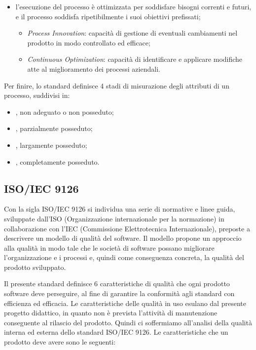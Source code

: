 \begin{itemize}
\begin{itemize}
        \end{itemize}
     \item  {} l'esecuzione del processo è ottimizzata per soddisfare bisogni correnti e futuri, e il processo soddisfa ripetibilmente i suoi obiettivi prefissati;
            \begin{itemize}
            	\item \emph{Process Innovation}: capacità di gestione di eventuali cambiamenti nel prodotto in modo controllato ed efficace;
            	\item \emph{Continuous Optimization}: capacità di identificare e applicare modifiche atte al miglioramento dei processi aziendali.
            \end{itemize} 
\end{itemize}
Per finire, lo standard definisce 4 stadi di misurazione degli attributi di un processo, suddivisi in:
\begin{itemize}
	\item {}, non adeguato o non posseduto;
	\item {}, parzialmente posseduto;
	\item {}, largamente posseduto;
	\item {}, completamente posseduto.
\end{itemize}

\subsection{ ISO/IEC 9126} %

Con la sigla ISO/IEC 9126 si individua una serie di normative e linee guida, sviluppate dall'ISO (Organizzazione internazionale per la normazione) in collaborazione con l'IEC (Commissione Elettrotecnica Internazionale), preposte a descrivere un modello di qualità del software. Il modello propone un approccio alla qualità in modo tale che le società di software possano migliorare l'organizzazione e i processi e, quindi come conseguenza concreta, la qualità del prodotto sviluppato.


Il presente standard definisce 6 caratteristiche di qualità che ogni prodotto software deve perseguire, al fine di garantire la conformità agli standard con efficienza ed efficacia. Le caratteristiche delle qualità in uso esulano dal presente progetto didattico, in quanto non è prevista l'attività di manutenzione conseguente al rilascio del prodotto. Quindi ci soffermiamo all'analisi della qualità interna ed esterna dello standard ISO/IEC 9126.
Le caratteristiche che un prodotto deve avere sono le seguenti:

